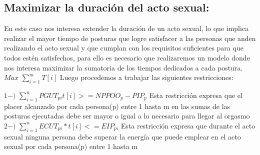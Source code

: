 \documentclass{llncs}
\begin{document}
\subsection{Maximizar la duración del acto sexual:}
En este caso nos interesa extender la duración de un acto sexual, lo que implica realizar el mayor tiempo de posturas que logre satisfacer a las personas que anden realizando el acto sexual y que cumplan con los requisitos suficientes para que todos estén satisfechos, para ello es necesario que realizaremos un modelo donde nos interesa maximizar la sumatoria de los tiempos dedicados a cada postura.
\newline
\newline
$Max$ $\sum_{i=1}^{m} T[i]$
\newline
\newline
Luego procedemos a trabajar las siguientes restricciones:

$1-)$ $\sum_{i=1}^{n} PGUT_{pi}t[i] >= NPPOO_{p} - PIP_{p}$
\newline
\newline
Esta restricción expresa que el placer alcanzado por cada persona(p) entre 1 hasta m en las sumas de las posturas ejecutadas debe ser mayor o igual a lo necesario para llegar al orgasmo
\newline
\newline
$2-)$ $\sum_{i=1}^{n} ECUT_{pi}*t[i] <= EIP_{pi}$
\newline
\newline
Esta restricción expresa que durante el acto sexual ninguna persona debe superar la energía que puede emplear en el acto sexual por cada persona(p) entre 1 hasta m
\end{document}

